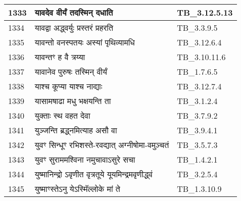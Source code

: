 \documentclass[17pt]{extarticle}
\begin{document}
\begin{longtable}{||p{0.4in}||p{4.9in}||p{0.9in}||}
    1333 & यावदेव वीर्यं तदस्मिन् दधाति & TB\_3.12.5.13       \\
    
    \hline
        
    1334 & यावद्वा अद्ध्वर्युः प्रस्तरं प्रहरति & TB\_3.3.9.5       \\
    
    \hline
        
    1335 & यावन्तो वनस्पतयः अस्यां पृथिव्यामधि & TB\_3.12.6.4       \\
    
    \hline
        
    1336 & यावन्तꣳ ह वै त्रय्या & TB\_3.10.11.6       \\
    
    \hline
        
    1337 & यावानेव पुरुषः तस्मिन् वीर्यं & TB\_1.7.6.5       \\
    
    \hline
        
    1338 & याश्च कूप्या याश्च नाद्याः & TB\_3.12.7.4       \\
    
    \hline
        
    1339 & यासामषाढा मधु भक्षयन्ति ता & TB\_3.1.2.4       \\
    
    \hline
        
    1340 & युक्ताः स्थ वहत देवा & TB\_3.7.9.2       \\
    
    \hline
        
    1341 & युञ्जन्ति ब्रद्ध्नमित्याह असौ वा & TB\_3.9.4.1       \\
    
    \hline
        
    1342 & युवꣳ सिन्धूꣳ रभिशस्ते{-}रवद्यात् अग्नीषोमा{-}वमुञ्चतं & TB\_3.5.7.3       \\
    
    \hline
        
    1343 & युवꣳ सुराममश्विना नमुचावाऽसुरे सचा & TB\_1.4.2.1       \\
    
    \hline
        
    1344 & युष्मानिन्द्रो ऽवृणीत वृत्रतूये यूयमिन्द्रमवृणीद्ध्वं & TB\_3.2.5.4       \\
    
    \hline
        
    1345 & युष्माꣳस्तेऽनु येऽस्मिॅल्लोके मां ते & TB\_1.3.10.9       \\
    

\end{longtable}
\end{document}
